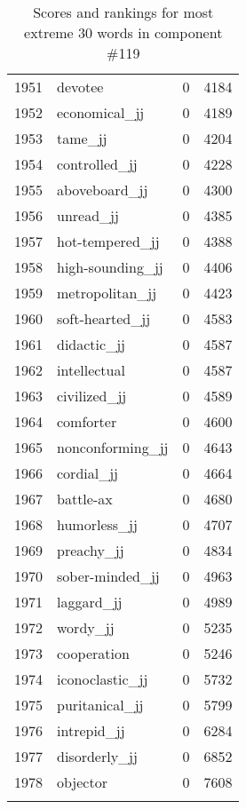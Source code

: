 \begin{longtable}[!htbp]{| rlr@{.}l |}
    1951 & devotee & 0 & 4184 \\
    1952 & economical\_jj & 0 & 4189 \\
    1953 & tame\_jj & 0 & 4204 \\
    1954 & controlled\_jj & 0 & 4228 \\
    1955 & aboveboard\_jj & 0 & 4300 \\
    1956 & unread\_jj & 0 & 4385 \\
    1957 & hot-tempered\_jj & 0 & 4388 \\
    1958 & high-sounding\_jj & 0 & 4406 \\
    1959 & metropolitan\_jj & 0 & 4423 \\
    1960 & soft-hearted\_jj & 0 & 4583 \\
    1961 & didactic\_jj & 0 & 4587 \\
    1962 & intellectual & 0 & 4587 \\
    1963 & civilized\_jj & 0 & 4589 \\
    1964 & comforter & 0 & 4600 \\
    1965 & nonconforming\_jj & 0 & 4643 \\
    1966 & cordial\_jj & 0 & 4664 \\
    1967 & battle-ax & 0 & 4680 \\
    1968 & humorless\_jj & 0 & 4707 \\
    1969 & preachy\_jj & 0 & 4834 \\
    1970 & sober-minded\_jj & 0 & 4963 \\
    1971 & laggard\_jj & 0 & 4989 \\
    1972 & wordy\_jj & 0 & 5235 \\
    1973 & cooperation & 0 & 5246 \\
    1974 & iconoclastic\_jj & 0 & 5732 \\
    1975 & puritanical\_jj & 0 & 5799 \\
    1976 & intrepid\_jj & 0 & 6284 \\
    1977 & disorderly\_jj & 0 & 6852 \\
    1978 & objector & 0 & 7608 \\
    \hline
    \caption{Scores and rankings for most extreme 30 words in component \#119} \\
\end{longtable}
